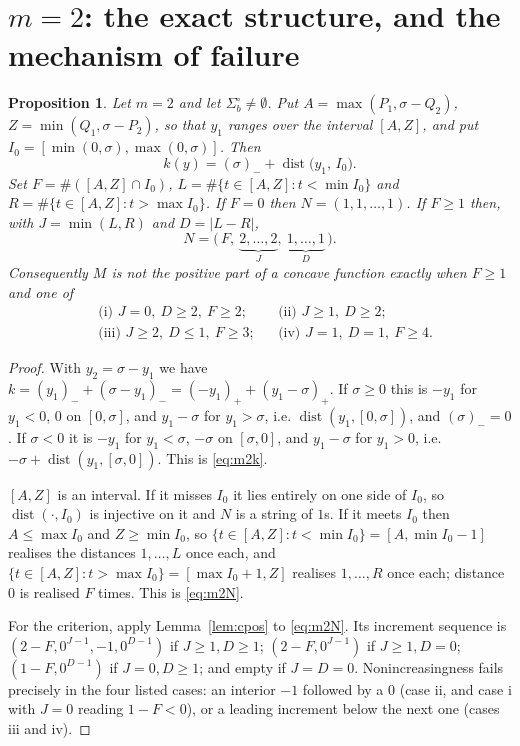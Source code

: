 \documentclass[11pt]{article}
\newtheorem{proposition}[theorem]{Proposition}
\theoremstyle{definition}
\DeclareMathOperator{\dist}{dist}
\newcommand{\abs}[1]{\lvert #1\rvert}
\newcommand{\pos}[1]{(#1)_{+}}
\newcommand{\nneg}[1]{(#1)_{-}}
\begin{document}
\section{$m=2$: the exact structure, and the mechanism of failure}

\begin{proposition}\label{prop:m2}
Let $m=2$ and let $\Sigma^\circ_b\ne\emptyset$. Put
$A=\max(P_1,\sigma-Q_2)$, $Z=\min(Q_1,\sigma-P_2)$, so that $y_1$ ranges over the
interval $[A,Z]$, and put $I_0=[\min(0,\sigma),\max(0,\sigma)]$. Then
\begin{equation}\label{eq:m2k}
  k(y)=\nneg{\sigma}+\dist\bigl(y_1,\,I_0\bigr).
\end{equation}
Set $F=\#([A,Z]\cap I_0)$, $L=\#\{t\in[A,Z]:t<\min I_0\}$ and
$R=\#\{t\in[A,Z]:t>\max I_0\}$. If $F=0$ then $N=(1,1,\dots,1)$. If $F\ge1$ then, with
$J=\min(L,R)$ and $D=\abs{L-R}$,
\begin{equation}\label{eq:m2N}
  N=\bigl(\,F,\ \underbrace{2,\dots,2}_{J},\ \underbrace{1,\dots,1}_{D}\,\bigr).
\end{equation}
Consequently $M$ is \emph{not} the positive part of a concave function exactly when
$F\ge1$ and one of
\[
  \begin{aligned}
  &\text{(i) }J=0,\ D\ge2,\ F\ge2; &&\text{(ii) }J\ge1,\ D\ge2;\\
  &\text{(iii) }J\ge2,\ D\le1,\ F\ge3; &&\text{(iv) }J=1,\ D=1,\ F\ge4 .
  \end{aligned}
\]
\end{proposition}

\begin{proof}
With $y_2=\sigma-y_1$ we have $k=\nneg{y_1}+\nneg{\sigma-y_1}=\pos{-y_1}+\pos{y_1-\sigma}$.
If $\sigma\ge0$ this is $-y_1$ for $y_1<0$, $0$ on $[0,\sigma]$, and $y_1-\sigma$ for
$y_1>\sigma$, i.e. $\dist(y_1,[0,\sigma])$, and $\nneg{\sigma}=0$. If $\sigma<0$ it is
$-y_1$ for $y_1<\sigma$, $-\sigma$ on $[\sigma,0]$, and $y_1-\sigma$ for $y_1>0$, i.e.
$-\sigma+\dist(y_1,[\sigma,0])$. This is \eqref{eq:m2k}.

$[A,Z]$ is an interval. If it misses $I_0$ it lies entirely on one side of $I_0$, so
$\dist(\cdot,I_0)$ is injective on it and $N$ is a string of $1$s. If it meets $I_0$ then
$A\le\max I_0$ and $Z\ge\min I_0$, so $\{t\in[A,Z]:t<\min I_0\}=[A,\min I_0-1]$ realises
the distances $1,\dots,L$ once each, and $\{t\in[A,Z]:t>\max I_0\}=[\max I_0+1,Z]$
realises $1,\dots,R$ once each; distance $0$ is realised $F$ times. This is
\eqref{eq:m2N}.

For the criterion, apply Lemma~\ref{lem:cpos} to \eqref{eq:m2N}. Its increment sequence
is $(2-F,0^{J-1},-1,0^{D-1})$ if $J\ge1,D\ge1$; $(2-F,0^{J-1})$ if $J\ge1,D=0$;
$(1-F,0^{D-1})$ if $J=0,D\ge1$; and empty if $J=D=0$. Nonincreasingness fails precisely
in the four listed cases: an interior $-1$ followed by a $0$ (case ii, and case i with
$J=0$ reading $1-F<0$), or a leading increment below the next one (cases iii and iv).
\end{proof}
\end{document}
